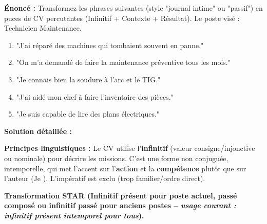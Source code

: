 \documentclass[11pt]{article}
\begin{document}
\begin{exoresolu}
\textbf{Énoncé :} Transformez les phrases suivantes (style "journal intime" ou "passif") en puces de CV percutantes (Infinitif + Contexte + Résultat). Le poste visé : Technicien Maintenance.

\begin{enumerate}
    \item "J'ai réparé des machines qui tombaient souvent en panne."
    \item "On m'a demandé de faire la maintenance préventive tous les mois."
    \item "Je connais bien la soudure à l'arc et le TIG."
    \item "J'ai aidé mon chef à faire l'inventaire des pièces."
    \item "Je suis capable de lire des plans électriques."
\end{enumerate}

\tcblower
\textbf{Solution détaillée :}

\noindent \textbf{Principes linguistiques :} Le CV utilise l'\textbf{infinitif} (valeur consigne/injonctive ou nominale) pour décrire les missions. C'est une forme non conjuguée, intemporelle, qui met l'accent sur l'\textbf{action} et la \textbf{compétence} plutôt que sur l'auteur (\og Je \fg). L'impératif est exclu (trop familier/ordre direct).

\noindent \textbf{Transformation STAR (Infinitif présent pour poste actuel, passé composé ou infinitif passé pour anciens postes -- \emph{usage courant : infinitif présent intemporel pour tous}).}


\end{exoresolu}
\end{document}
